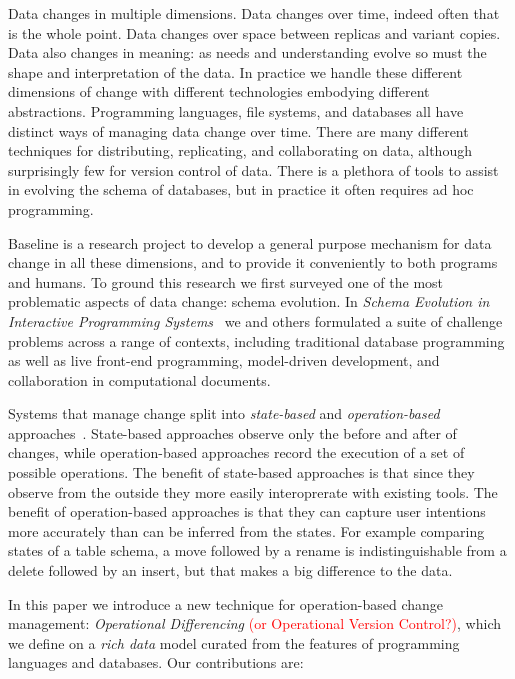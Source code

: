 \documentclass[english,submission]{programming}
\theoremstyle{definition}
\begin{document}
Data changes in multiple dimensions. Data changes over time, indeed often that is the whole point. Data changes over space between replicas and variant copies. Data also changes in meaning: as needs and understanding evolve so must the shape and interpretation of the data. In practice we handle these different dimensions of change with different technologies embodying different abstractions. Programming languages, file systems, and databases all have distinct ways of managing data change over time. There are many different techniques for distributing, replicating, and collaborating on data, although surprisingly few for version control of data. There is a plethora of tools to assist in evolving the schema of databases, but in practice it often requires ad hoc programming.

Baseline is a research project to develop a general purpose mechanism for data change in all these dimensions, and to provide it conveniently to both programs and humans.
To ground this research we first surveyed one of the most problematic aspects of data change: schema evolution. In \textit{Schema Evolution in Interactive Programming Systems}~\cite{challenge-problems} we and others formulated a suite of challenge problems across a range of contexts, including traditional database programming as well as live front-end programming, model-driven development, and collaboration in computational documents.

Systems that manage change split into \textit{state-based} and \textit{operation-based} approaches~\cite{diff3, Shapiro11, edit-lenses}. State-based approaches observe only the before and after of changes, while operation-based approaches record the execution of a set of possible operations.
The benefit of state-based approaches is that since they observe from the outside they more easily interoprerate with existing tools.
The benefit of operation-based approaches is that they can capture user intentions more accurately than can be inferred from the states. For example comparing states of a table schema, a move followed by a rename is indistinguishable from a delete followed by an insert, but that makes a big difference to the data.

In this paper we introduce a new technique for operation-based change management: \textit{Operational Differencing}\textcolor{red}{ (or Operational Version Control?)}, which we define on a \textit{rich data} model curated from the features of programming languages and databases. Our contributions are:
\end{document}
